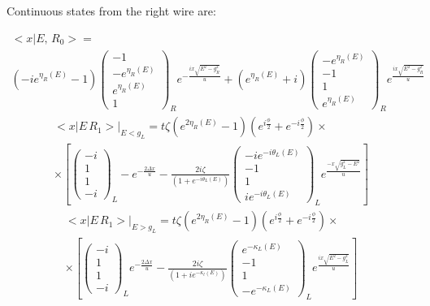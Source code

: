 Continuous states from the right wire are:

\begin{multline}
	\big<x\big|E,\,R_{0}\big>=
	\\
	\left(-ie^{\eta_{R}\left(E\right)}-1\right)\begin{pmatrix}-1\\
	-e^{\eta_{R}\left(E\right)}\\
	e^{\eta_{R}\left(E\right)}\\
	1
	\end{pmatrix}_{R}e^{-\frac{ix\sqrt{E^{2}-g_{R}^{2}}}{u}}+\left(e^{\eta_{R}\left(E\right)}+i\right)\begin{pmatrix}-e^{\eta_{R}\left(E\right)}\\
	-1\\
	1\\
	e^{\eta_{R}\left(E\right)}
	\end{pmatrix}_{R}e^{\frac{ix\sqrt{E^{2}-g_{R}^{2}}}{u}}
\end{multline}
\begin{multline}
	\big<x\big|E\,R_{1}\big>\Big|_{E<g_{L}}=
	t\zeta\left(e^{2\eta_{R}\left(E\right)}-1\right)\left(e^{i\frac{\phi}{2}}+e^{-i\frac{\phi}{2}}\right)\times
	\\
	\times\left[\begin{pmatrix}-i\\
	1\\
	1\\
	-i
	\end{pmatrix}_{L}-e^{-\frac{2\Delta x}{u}}-\frac{2i\zeta}{\left(1+e^{-i\theta_{L}\left(E\right)}\right)}\begin{pmatrix}-ie^{-i\theta_{L}\left(E\right)}\\
	-1\\
	1\\
	ie^{-i\theta_{L}\left(E\right)}
	\end{pmatrix}_{L}e^{\frac{-x\sqrt{g_{L}^{2}-E^{2}}}{u}}\right]
\end{multline}
\begin{multline}
	\big<x\big|E\,R_{1}\big>\Big|_{E>g_{L}}=
	t\zeta\left(e^{2\eta_{R}\left(E\right)}-1\right)\left(e^{i\frac{\phi}{2}}+e^{-i\frac{\phi}{2}}\right)\times\\
	\times
	\left[\begin{pmatrix}-i\\
	1\\
	1\\
	-i
	\end{pmatrix}_{L}e^{-\frac{2\Delta x}{u}}-\frac{2i\zeta}{\left(1+ie^{-\kappa_{l}\left(E\right)}\right)}\begin{pmatrix}e^{-\kappa_{L}\left(E\right)}\\
	-1\\
	1\\
	-e^{-\kappa_{L}\left(E\right)}
	\end{pmatrix}_{L}e^{\frac{ix\sqrt{E^{2}-g_{L}^{2}}}{u}}\right]
\end{multline}
